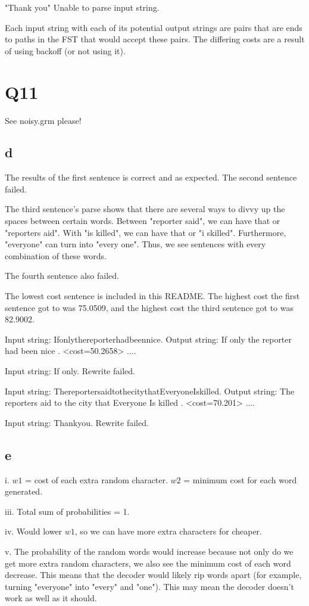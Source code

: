 \documentclass[12pt, letterpaper]{article}
\begin{document}
"Thank you"
Unable to parse input string.

Each input string with each of its potential output strings are pairs that are ends to paths in the FST that would accept these pairs. The differing costs are a result of using backoff (or not using it). 

\section{Q11}
See noisy.grm please!

\subsection{d}
The results of the first sentence is correct and as expected. The second sentence failed. 

The third sentence's parse shows that there are several ways to divvy up the spaces between certain words. Between "reporter said", we can have that or "reporters aid". With "is killed", we can have that or "i skilled". Furthermore, "everyone" can turn into "every one". Thus, we see sentences with every combination of these words. 

The fourth sentence also failed. 

The lowest cost sentence is included in this README. The highest cost the first sentence got to was 75.0509, and the highest cost the third sentence got to was 82.9002. 

Input string: Ifonlythereporterhadbeennice.
Output string: If only the reporter had been nice .  <cost=50.2658>
....

Input string: If only.
Rewrite failed.

Input string: ThereportersaidtothecitythatEveryoneIskilled.
Output string: The reporters aid to the city that Everyone Is killed .  <cost=70.201>
....

Input string: Thankyou.
Rewrite failed.

\subsection{e}
i. $w1$ = cost of each extra random character. $w2$ = minimum cost for each word generated.

iii. Total sum of probabilities = 1.

iv. Would lower $w1$, so we can have more extra characters for cheaper.

v. The probability of the random words would increase because not only do we get more extra random characters, we also see the minimum cost of each word decrease. This means that the decoder would likely rip words apart (for example, turning "everyone" into "every" and "one"). This may mean the decoder doesn't work as well as it should. 
\end{document}
